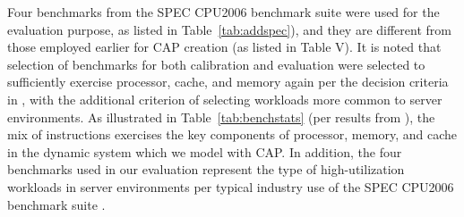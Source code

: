 \documentclass[prodmode,acmtaco,pdftex]{acmsmall}
\begin{document}
Four benchmarks from the SPEC CPU2006 benchmark suite were used for the
evaluation purpose, as listed in Table~\ref{tab:addspec}), and they are
different from those employed earlier for CAP creation (as listed in
Table V). It is noted that selection of benchmarks for both calibration
and evaluation were selected to sufficiently exercise processor, cache,
and memory again per the decision criteria in \cite{Phansalkar2007},
with the additional criterion of selecting workloads more common to
server environments. As illustrated in Table~\ref{tab:benchstats}
(per results from \cite{Phansalkar2007}), the mix of instructions
exercises the key components of processor, memory, and cache in the
dynamic system which we model with CAP. In addition, the four
benchmarks used in our evaluation represent the type of high-utilization
workloads in server environments per typical industry use of the SPEC
CPU2006 benchmark suite \cite{Cisco2010}.
\begin{table}%
\end{table}

\end{document}
